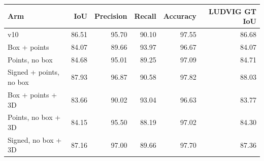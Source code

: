 \begin{tabular}{lrrrrr}
\toprule
Arm & IoU & Precision & Recall & Accuracy & LUDVIG GT IoU \\\midrule
v10 & 86.51 & 95.70 & 90.10 & 97.55 & 86.68 \\
Box + points & 84.07 & 89.66 & 93.97 & 96.67 & 84.07 \\
Points, no box & 84.68 & 95.01 & 89.25 & 97.09 & 84.71 \\
Signed + points, no box & 87.93 & 96.87 & 90.58 & 97.82 & 88.03 \\
Box + points + 3D & 83.66 & 90.02 & 93.04 & 96.63 & 83.77 \\
Points, no box + 3D & 84.15 & 95.50 & 88.19 & 97.02 & 84.30 \\
Signed, no box + 3D & 87.16 & 97.00 & 89.66 & 97.70 & 87.36 \\
\bottomrule
\end{tabular}
